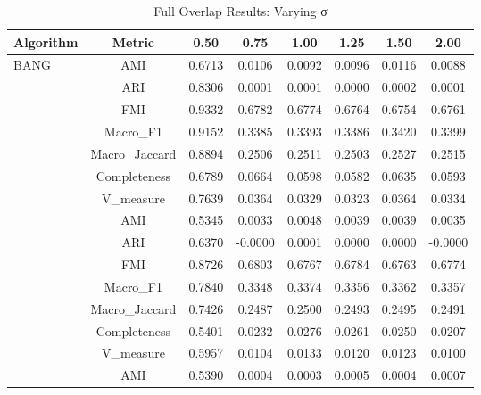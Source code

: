 \begin{table}[ht!]
\centering
\caption{Full Overlap Results: Varying σ}
\label{tab:overlap_vary_sigma_full}
\begin{tabular*}{\linewidth}{@{} lc c c c c c c @{}}
\toprule
Algorithm & Metric & 0.50 & 0.75 & 1.00 & 1.25 & 1.50 & 2.00 \\
\midrule
\multirow{7}{*}{BANG}
 & AMI  & 0.6713 & 0.0106 & 0.0092 & 0.0096 & 0.0116 & 0.0088 \\

 & ARI  & 0.8306 & 0.0001 & 0.0001 & 0.0000 & 0.0002 & 0.0001 \\

 & FMI  & 0.9332 & 0.6782 & 0.6774 & 0.6764 & 0.6754 & 0.6761 \\

 & Macro_F1  & 0.9152 & 0.3385 & 0.3393 & 0.3386 & 0.3420 & 0.3399 \\

 & Macro_Jaccard  & 0.8894 & 0.2506 & 0.2511 & 0.2503 & 0.2527 & 0.2515 \\

 & Completeness  & 0.6789 & 0.0664 & 0.0598 & 0.0582 & 0.0635 & 0.0593 \\

 & V_measure  & 0.7639 & 0.0364 & 0.0329 & 0.0323 & 0.0364 & 0.0334 \\
\addlinespace
\multirow{7}{*}{CLIQUE}
 & AMI  & 0.5345 & 0.0033 & 0.0048 & 0.0039 & 0.0039 & 0.0035 \\

 & ARI  & 0.6370 & -0.0000 & 0.0001 & 0.0000 & 0.0000 & -0.0000 \\

 & FMI  & 0.8726 & 0.6803 & 0.6767 & 0.6784 & 0.6763 & 0.6774 \\

 & Macro_F1  & 0.7840 & 0.3348 & 0.3374 & 0.3356 & 0.3362 & 0.3357 \\

 & Macro_Jaccard  & 0.7426 & 0.2487 & 0.2500 & 0.2493 & 0.2495 & 0.2491 \\

 & Completeness  & 0.5401 & 0.0232 & 0.0276 & 0.0261 & 0.0250 & 0.0207 \\

 & V_measure  & 0.5957 & 0.0104 & 0.0133 & 0.0120 & 0.0123 & 0.0100 \\
\addlinespace
\multirow{7}{*}{DBSCAN}
 & AMI  & 0.5390 & 0.0004 & 0.0003 & 0.0005 & 0.0004 & 0.0007 \\


\end{tabular*}
\end{table}
